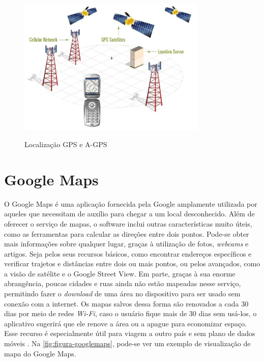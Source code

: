 \begin{figure}[H]
    \centering
    \caption{Localização GPS e A-GPS}
    \includegraphics[width=0.8\textwidth]{./dados/figuras/fig5}
    \label{fig:figura-localizacaoGpsAgps}
\end{figure}

\section{Google Maps}

O Google Maps é uma aplicação fornecida pela Google amplamente utilizada por aqueles que necessitam de auxílio para chegar a um local desconhecido. Além de oferecer o serviço de mapas, o software inclui outras características muito úteis, como as ferramentas para calcular as direções entre dois pontos. Pode-se obter mais informações sobre qualquer lugar, graças à utilização de fotos, \textit{webcams} e artigos. Seja pelos seus recursos básicos, como encontrar endereços específicos e verificar trajetos e distâncias entre dois ou mais pontos, ou pelos avançados, como a visão de satélite e o Google Street View. Em parte, graças à sua enorme abrangência, poucas cidades e ruas ainda não estão mapeadas nesse serviço, permitindo fazer o \textit{download} de uma área no dispositivo para ser usado sem conexão com a internet. Os mapas salvos dessa forma são renovados a cada 30 dias por meio de redes \textit{Wi-Fi}, caso o usuário fique mais de 30 dias sem usá-los, o aplicativo sugerirá que ele renove a área ou a apague para economizar espaço. Esse recurso é especialmente útil para viagem a outro país e sem plano de dados móveis \cite{google:2019}. Na \autoref{fig:figura-googlemaps}, pode-se ver um exemplo de visualização de mapa do Google Maps.

